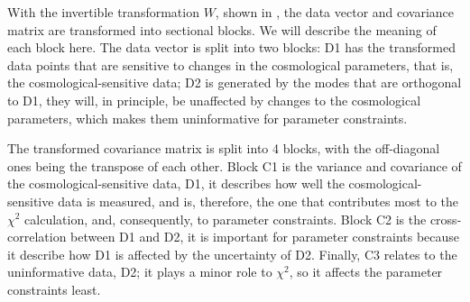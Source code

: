 	With the invertible transformation $W$, shown in , the data vector and covariance matrix are transformed into sectional blocks. We will describe the meaning of each block here. The data vector is split into two blocks: D1 has the transformed data points that are sensitive to changes in the cosmological parameters, that is, the cosmological-sensitive data; D2 is generated by the modes that are orthogonal to D1, they will, in principle, be unaffected by changes to the cosmological parameters, which makes them uninformative for parameter constraints.
	
	The transformed covariance matrix is split into 4 blocks, with the off-diagonal ones being the transpose of each other. Block C1 is the variance and covariance of the cosmological-sensitive data, D1, it describes how well the cosmological-sensitive data is measured, and is, therefore, the one that contributes most to the $\chi^2$ calculation, and, consequently, to parameter constraints. Block C2 is the cross-correlation between D1 and D2, it is important for parameter constraints because it describe how D1 is affected by the uncertainty of D2.  Finally, C3 relates to the uninformative data, D2; it plays a minor role to $\chi^2$, so it affects the parameter constraints least.
	
	
	
